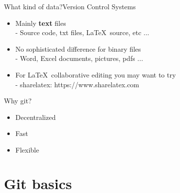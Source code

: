 \documentclass[10pt,xcolor=dvipsnames]{beamer}
\begin{document}
\begin{frame}{What kind of data?}{Version Control Systems}
\begin{itemize}
  \setlength\itemsep{0.4in}
\item Mainly {\bf text} files\\
- Source code, txt files, \LaTeX\  source, etc ...
\item No sophisticated difference for binary files\\
- Word, Excel documents, pictures, pdfs ...
\item For \LaTeX\ collaborative editing you may want to try\\
- sharelatex: https://www.sharelatex.com
\end{itemize}
\end{frame}



\begin{frame}{Why git?}
\begin{itemize}
\item Decentralized
\item Fast
\item Flexible
\end{itemize}
\end{frame}
\section{Git basics}
\end{document}
